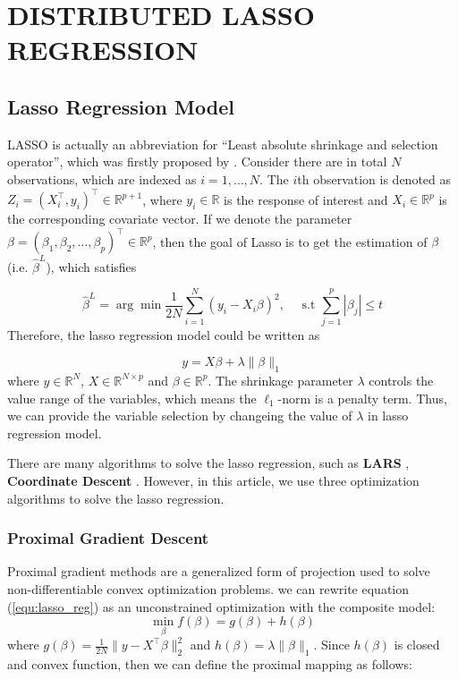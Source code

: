\documentclass[11pt,en,authoryear]{elegantpaper}
\numberwithin{equation}{section}
\newcommand{\mbR}{\mathbb{R}}
\begin{document}
\section{DISTRIBUTED LASSO REGRESSION}\label{sec:2}

\subsection{Lasso Regression Model}\label{section:lasso_reg_model}

LASSO is actually an abbreviation for “Least absolute shrinkage and selection operator”, which was firstly proposed by \cite{tibshirani1996regression}. Consider there are in total $N$ observations, which are indexed as $i = 1,\ldots,N$. The $i$th observation is denoted as $Z_i = (X_i^{\top},y_i)^{\top} \in \mathbb{R}^{p+1}$, where $y_i \in \mathbb{R}$ is the response of interest and $X_i \in \mathbb{R}^p$ is the corresponding covariate vector. If we denote the parameter $\beta = (\beta_1, \beta_2, \ldots, \beta_p)^{\top} \in \mathbb{R}^{p}$, then the goal of Lasso is to get the estimation of $\beta$ (i.e. $\hat{\beta}^{L}$), which satisfies

\begin{equation}\label{equ:lasso}
    \hat{\beta}^{L}=\arg \min \frac{1}{2 N} \sum_{i=1}^{N}\left(y_{i}-X_i \beta\right)^{2}, \quad \text { s.t } \sum_{j=1}^{p}\left|\beta_{j}\right| \leq t
\end{equation}
Therefore, the lasso regression model could be written as 

\begin{equation}\label{equ:lasso_reg}
    y = X \beta + \lambda \|\beta \|_1
\end{equation}
where $y \in \mbR^{N}$, $X \in \mbR^{N \times p}$ and $\beta \in \mbR^{p}$. The shrinkage parameter $\lambda$ controls the value range of the variables, which means the $\ell_1$-norm is a penalty term. Thus, we can provide the variable selection by changeing the value of $\lambda$ in lasso regression model.

There are many algorithms to solve the lasso regression, such as \textbf{LARS} \citep{efron2004least}, \textbf{Coordinate Descent} \citep{wu2008coordinate}. However, in this article, we use three optimization algorithms to solve the lasso regression.

\subsubsection{Proximal Gradient Descent}
Proximal gradient methods are a generalized form of projection used to solve non-differentiable convex optimization problems. we can rewrite  equation (\ref{equ:lasso_reg}) as an unconstrained optimization with the composite model:
\begin{equation}
    \min_{\beta} f(\beta)=g(\beta)+h(\beta)
\end{equation}
where $g(\beta) = \frac{1}{2N}\|y - X^{\top}\beta\|_{2}^{2}$ and $h(\beta) = \lambda\| \beta\|_1$. Since $h(\beta)$ is closed and convex function, then we can define the proximal mapping as follows:
\end{document}
